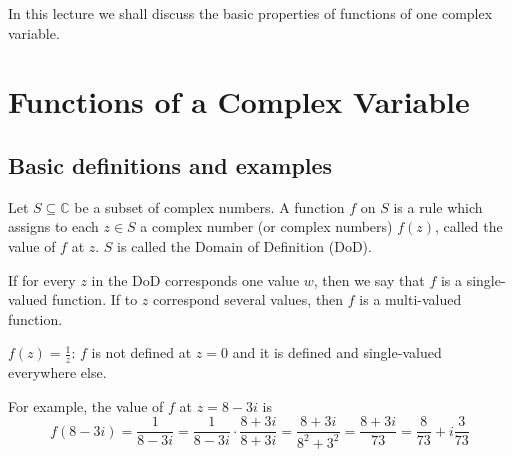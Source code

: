 
% 
% 
% 
% 
% 
% 
% 
% 
% 
% 
% 

\graphicspath{{./input/graphs/note02/}}


% 




In this lecture we shall discuss the basic properties of functions of one complex variable.

\section{Functions of a Complex Variable}

\subsection{Basic definitions and examples}

\begin{definition}\label{definition:2.1}
     Let $S \subseteq \mathbb{C}$ be a subset of complex numbers. A function $f$ on $S$ is a rule which assigns to each $z \in S$ a complex number (or complex numbers) $f(z)$, 
    called the value of $f$ at $z$. $S$ is called the Domain of Definition (DoD).
\end{definition}
\begin{definition} \label{definition:2.2}
     If for every $z$ in the DoD corresponds one value $w$, then we say that $f$ is a single-valued function. If to $z$ correspond several values, then $f$ is a multi-valued function.
\end{definition}
\begin{example} \label{example:3.1}
     $f(z) = \frac{1}{z}$: $f$ is not defined at $z = 0$ and it is defined and single-valued everywhere else.
\end{example}
For example, the value of $f$ at $z = 8 - 3i$ is
\[ f(8 - 3i) = \frac{1}{8 - 3i} = \frac{1}{8 - 3i} \cdot \frac{8 + 3i}{8 + 3i} = \frac{8 + 3i}{8^2 + 3^2} = \frac{8 + 3i}{73} = \frac{8}{73} + i\frac{3}{73}\]

